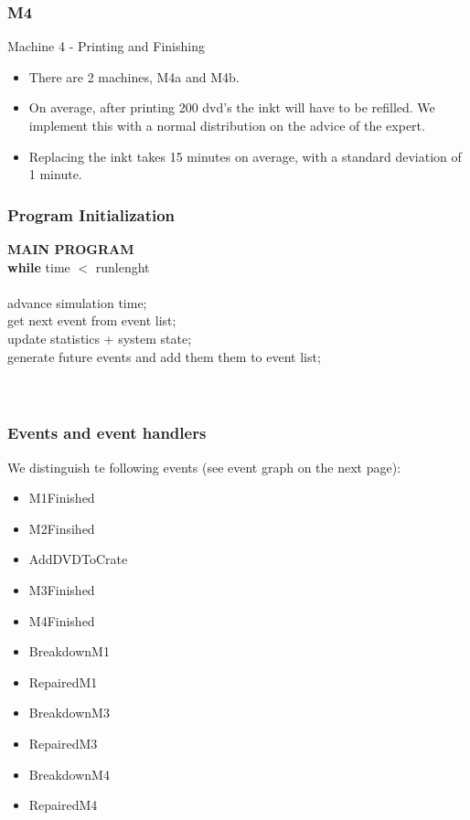 \documentclass[11pt,a4paper]{article}
\newcommand{\tab}{\hspace*{2em}}
\begin{document}
\subsubsection{M4}
Machine 4 - Printing and Finishing
\begin{itemize}
\item  There are 2 machines, M4a and M4b. 
\item On average, after printing 200 dvd's the inkt will have to be refilled. We implement this with a normal distribution on the advice of the expert. 
\item Replacing the inkt takes 15 minutes on average, with a standard deviation of 1 minute.
\end{itemize}

\subsubsection{Program Initialization}
\noindent \textbf{MAIN PROGRAM} \textbraceleft\\
	\tab \textbf{while} time $<$ runlenght \\
	\tab \textbraceleft\\
	\tab \tab advance simulation time; \\
	\tab \tab get next event from event list; \\
	\tab \tab update statistics + system state; \\
	\tab \tab generate future events and add them them to event list; \\
	\tab \textbraceright \\
\textbraceright \\


\subsubsection{Events and event handlers}
We distinguish te following events (see event graph on the next page):
\begin{itemize}
\item M1Finished
\item M2Finsihed
\item AddDVDToCrate
\item M3Finished
\item M4Finished
\item BreakdownM1
\item RepairedM1
\item BreakdownM3
\item RepairedM3
\item BreakdownM4
\item RepairedM4
\end{itemize}
\end{document}
